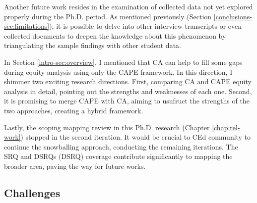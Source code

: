 Another future work resides in the examination of collected data not yet explored properly during the \gls{Ph.D.} period. As mentioned previously (Section \ref{conclusions-sec:limitations}), it is possible to delve into other interview transcripts or even collected documents to deepen the knowledge about this phenomenon by triangulating the sample findings with other student data. 

In Section \ref{intro-sec:overview}, I mentioned that \gls{CA} can help to fill some gaps during equity analysis using only the
\gls{CAPE} framework. In this direction, I shimmer two exciting research directions. First, comparing \gls{CA} and \gls{CAPE} equity analysis in detail, pointing out the strengths and weaknesses of each one. Second, it is promising to merge \gls{CAPE} with \gls{CA}, aiming to usufruct the strengths of the two approaches, creating a hybrid framework.

Lastly, the scoping mapping review in this \gls{Ph.D.} research (Chapter \ref{chap:rel-work}) stopped in the second iteration. It would be crucial to \gls{CEd} community to continue the snowballing approach, conducting the remaining iterations. The \acrfull{SRQ} and \acrlong{DSRQ}s (\acrshort{DSRQ}) coverage contribute significantly to mapping the broader area, paving the way for future works.



                

        

        

\subsection{Challenges}

